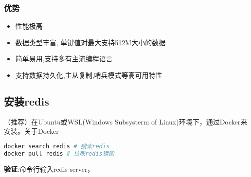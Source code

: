 \subsubsection{优势}
\begin{itemize}
\item 性能极高
\item 数据类型丰富, 单键值对最大支持512M大小的数据
\item 简单易用,支持多有主流编程语言
\item 支持数据持久化,主从复制,哨兵模式等高可用特性
\end{itemize}

\subsection{安装redis}
（推荐）在Ubuntu或WSL(Windows Subsysterm of Linux)环境下，通过Docker来安装。关于Docker
\begin{lstlisting}[language=bash]
docker search redis # 搜索redis
docker pull redis # 拉取redis镜像
\end{lstlisting}

\textbf{验证}:命令行输入redis-server，